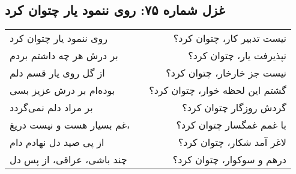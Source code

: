 \begin{center}
\section*{غزل شماره ۷۵: روی ننمود یار چتوان کرد}
\label{sec:075}
\begin{longtable}{l p{0.5cm} r}
روی ننمود یار چتوان کرد
&&
نیست تدبیر کار، چتوان کرد؟
\\
بر درش هر چه داشتم بردم
&&
نپذیرفت یار، چتوان کرد؟
\\
از گل روی یار قسم دلم
&&
نیست جز خارخار، چتوان کرد؟
\\
بوده‌ام بر درش عزیز بسی
&&
گشتم این لحظه خوار، چتوان کرد؟
\\
بر مراد دلم نمی‌گردد
&&
گردش روزگار چتوان کرد؟
\\
غم بسیار هست و نیست دریغ،
&&
با غمم غمگسار چتوان کرد؟
\\
از پی صید دل نهادم دام
&&
لاغر آمد شکار، چتوان کرد؟
\\
چند باشی، عراقی، از پس دل
&&
درهم و سوکوار، چتوان کرد؟
\\
\end{longtable}
\end{center}
